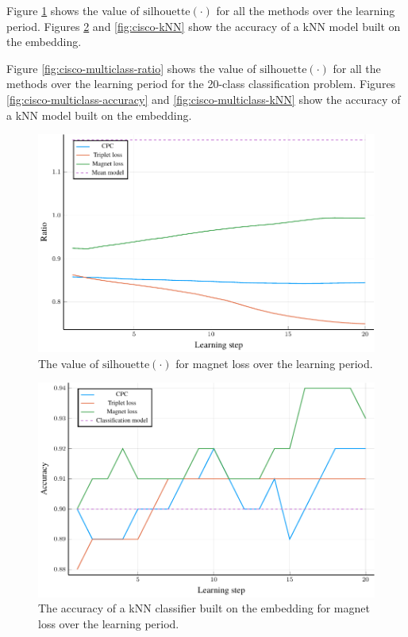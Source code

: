 Figure \ref{fig:cisco-ratio} shows the value of \( \mathrm{silhouette} \left( \cdot \right) \) for all the methods over the learning period. Figures \ref{fig:cisco-accuracy} and \ref{fig:cisco-kNN} show the accuracy of a kNN model built on the embedding.

Figure \ref{fig:cisco-multiclass-ratio} shows the value of \( \mathrm{silhouette} \left( \cdot \right) \) for all the methods over the learning period for the 20-class classification problem. Figures \ref{fig:cisco-multiclass-accuracy} and \ref{fig:cisco-multiclass-kNN} show the accuracy of a kNN model built on the embedding. 

\begin{figure}[h]
  \centering
  \includegraphics[width=\textwidth]{images/cisco/ratio/cisco-ratio.pdf}
  \caption{The value of \( \mathrm{silhouette} \left( \cdot \right) \) for magnet loss over the learning period.}\label{fig:cisco-ratio}
\end{figure}

\begin{figure}[h]
  \centering
  \includegraphics[width=\textwidth]{images/cisco/accuracy/cisco-accuracy.pdf}
  \caption{The accuracy of a kNN classifier built on the embedding for magnet loss over the learning period.}\label{fig:cisco-accuracy}
\end{figure}

